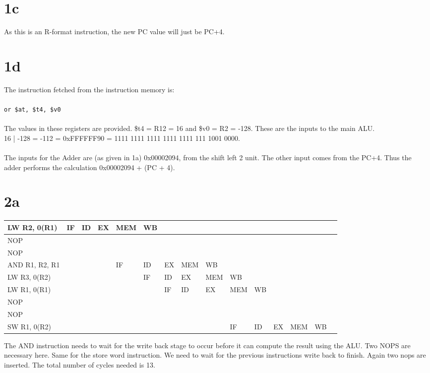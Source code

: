 \documentclass[10pt,a4paper]{article}
\begin{document}
	\section*{1c}
	As this is an R-format instruction, the new PC value will just be PC+4.
	\section*{1d}
	The instruction fetched from the instruction memory is: \\\\
	\verb|or $at, $t4, $v0| \\\\
	The values in these registers are provided. \$t4 = R12 = 16 and \$v0 = R2 = -128. These are the inputs to the main ALU.\\
	16 | -128 = -112 = 0xFFFFFF90 = 1111 1111 1111 1111 1111 111 1001 0000.\\\\
	The inputs for the Adder are (as given in 1a) 0x00002094, from the shift left 2 unit. The other input comes from the PC+4. Thus the adder performs the calculation 0x00002094 + (PC + 4).
	\section*{2a}
	\begin{table}[h]
		\centering
		\label{my-label}
		\begin{tabular}{|l|l|l|l|l|l|l|l|l|l|l|l|l|l|l|}
			\hline
			LW R2, 0(R1) & IF  & ID  & EX  & MEM  & WB  &  &  &  &  &  &  &  &   \\ \hline
			NOP &  &  &  &  &  &  &  &  &  &  &  &  &    \\ \hline
			NOP &  &  &  &  &  &  &  &  &  &  &  &  &    \\ \hline
			AND R1, R2, R1 &  &  &  & IF& ID  & EX  & MEM & WB &  &  &  &  &    \\ \hline
			LW R3, 0(R2)&  &  &  &  &  IF & ID  & EX & MEM & WB &  &  &  &    \\ \hline
			LW R1, 0(R1)&  &  &  &  &  & IF & ID & EX & MEM  & WB  &  &  &  \\ \hline
			NOP &  &  &  &  &  &  &  &  &  &  &  &  &    \\ \hline
			NOP&  &  &  &  &  &  &  &  &  &  &  &  &    \\ \hline
			SW R1, 0(R2)&  &  &  &  &  &  &  &  & IF & ID & EX  & MEM  & WB    \\ \hline
		\end{tabular}
	\end{table}
\noindent	The AND instruction needs to wait for the write back stage to occur before it can compute the result using the ALU. Two NOPS are necessary here. Same for the store word instruction. We need to wait for the previous instructions write back to finish. Again two nops are inserted. The total number of cycles needed is 13.
\end{document}
